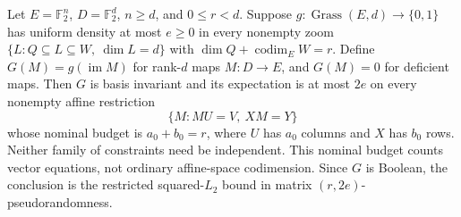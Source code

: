 \begin{lemma}\label{lem:matrix-lift}
Let $E=\mathbb F_2^n$, $D=\mathbb F_2^d$, $n\ge d$, and
$0\le r<d$. Suppose $g:\operatorname{Grass}(E,d)\to\{0,1\}$ has
uniform density at most $e\ge0$ in every nonempty zoom
$\{L:Q\subseteq L\subseteq W,\ \dim L=d\}$ with
$\dim Q+\operatorname{codim}_E W=r$.
Define $G(M)=g(\operatorname{im}M)$ for rank-$d$ maps $M:D\to E$,
and $G(M)=0$ for deficient maps. Then $G$ is basis invariant and
its expectation is at most $2e$ on every nonempty affine restriction
\[
 \{M:MU=V,\ XM=Y\}
\]
whose nominal budget is $a_0+b_0=r$, where $U$ has $a_0$ columns and
$X$ has $b_0$ rows. Neither family of constraints need be independent.
This nominal budget counts vector equations, not ordinary affine-space
codimension. Since $G$ is Boolean, the conclusion is the restricted
squared-$L_2$ bound in matrix $(r,2e)$-pseudorandomness.
\end{lemma}
